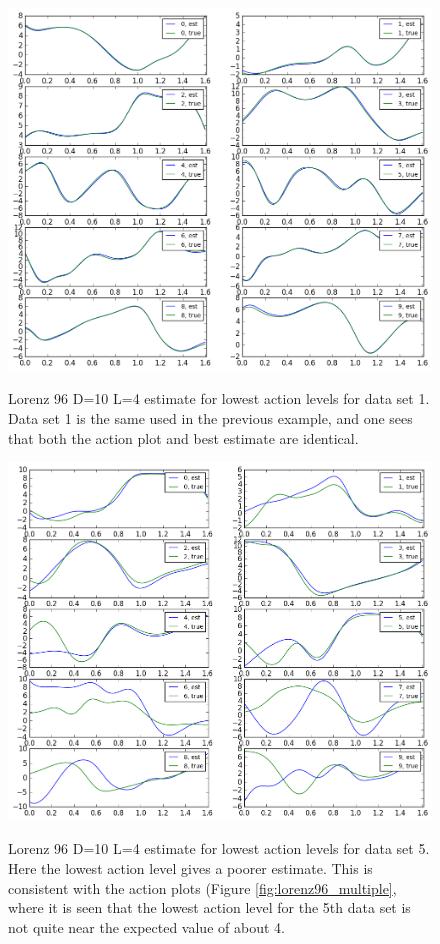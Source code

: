 \documentclass[11pt]{article}
\begin{document}
{\begin{figure}[h]
\centering
\includegraphics[width=1\textwidth]{figure/Lorenz96_multiple/estimation_1.png} \\
\caption{Lorenz 96 D=10 L=4 estimate for lowest action levels for data set 1. Data set 1 is the same used in the previous example, and one sees that both the action plot and best estimate are identical.}
\end{figure}

\begin{figure}[h]
\centering
\includegraphics[width=1\textwidth]{figure/Lorenz96_multiple/estimation_5.png} \\
\caption{Lorenz 96 D=10 L=4 estimate for lowest action levels for data set 5. Here the lowest action level gives a poorer estimate. This is consistent with the action plots (Figure \ref{fig:lorenz96_multiple}, where it is seen that the lowest action level for the 5th data set is not quite near the expected value of about 4.}
\end{figure}


}
\end{document}
